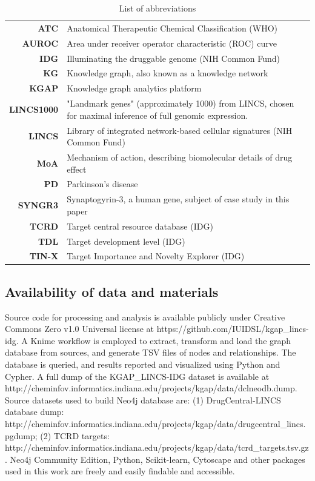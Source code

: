 \begin{table}
\caption{List of abbreviations}
\begin{center}
\begin{tabular}{ |rl| }
\hline
\textbf{ATC} & Anatomical Therapeutic Chemical Classification (WHO) \\
\textbf{AUROC} & Area under receiver operator characteristic (ROC) curve \\
\textbf{IDG} & Illuminating the druggable genome (NIH Common Fund) \\
\textbf{KG} & Knowledge graph, also known as a knowledge network \\
\textbf{KGAP} & Knowledge graph analytics platform \\
\textbf{LINCS1000} & "Landmark genes" (approximately 1000) from LINCS, chosen for maximal inference of full genomic expression. \\
\textbf{LINCS} & Library of integrated network-based cellular signatures (NIH Common Fund) \\
\textbf{MoA} & Mechanism of action, describing biomolecular details of drug effect \\
\textbf{PD} & Parkinson's disease \\
\textbf{SYNGR3} & Synaptogyrin-3, a human gene, subject of case study in this paper \\
\textbf{TCRD} & Target central resource database (IDG) \\
\textbf{TDL} & Target development level (IDG) \\
\textbf{TIN-X} & Target Importance and Novelty Explorer (IDG) \\
\hline
\end{tabular}
\end{center}
\label{tab:abbr}
\end{table}

\subsection{Availability of data and materials}

Source code for processing and analysis is available publicly under Creative Commons Zero v1.0 Universal license at  https://github.com/IUIDSL/kgap\_lincs-idg. A Knime workflow is employed to extract, transform and load the graph database from sources, and generate TSV files of nodes and relationships. The database is queried, and results reported and visualized using Python and Cypher. A full dump of the KGAP\_LINCS-IDG dataset is available at http://cheminfov.informatics.indiana.edu/projects/kgap/data/dclneodb.dump. Source datasets used to build Neo4j database are: (1) DrugCentral-LINCS database dump: http://cheminfov.informatics.indiana.edu/projects/kgap/data/drugcentral\_lincs.pgdump; (2) TCRD targets: http://cheminfov.informatics.indiana.edu/projects/kgap/data/tcrd\_targets.tsv.gz. Neo4j Community Edition, Python, Scikit-learn, Cytoscape and other packages used in this work are freely and easily findable and accessible.
